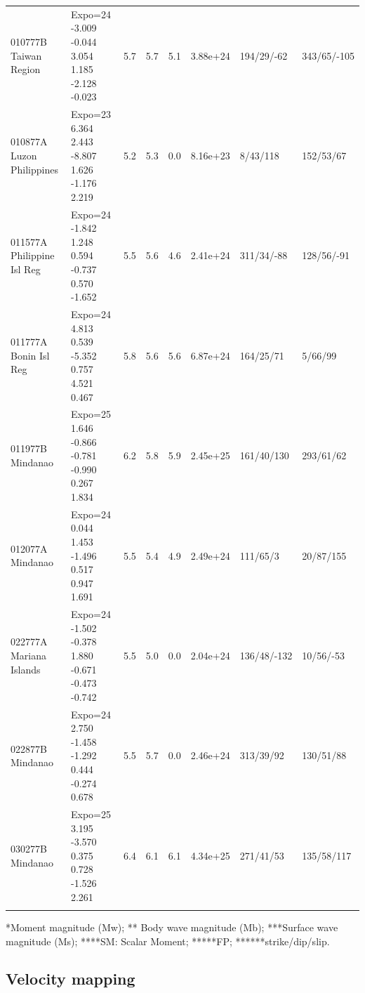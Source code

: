\documentclass[11pt,a4paper]{report}
\begin{document}
{\begin{table}[H]
\begin{center}
{\begin{tabular}{l l l l l l l l}
	010777B Taiwan Region & \makecell{Expo=24 -3.009 -0.044 \\ 3.054 1.185 -2.128 -0.023} & 5.7 & 5.7 & 5.1 & 3.88e+24 & 194/29/-62 & 343/65/-105 \\
	010877A Luzon Philippines & \makecell{Expo=23 6.364 2.443 \\ -8.807 1.626 -1.176 2.219} & 5.2 & 5.3 & 0.0 & 8.16e+23 & 8/43/118 & 152/53/67 \\
	 011577A Philippine Isl Reg & \makecell{Expo=24 -1.842 1.248 \\ 0.594 -0.737 0.570 -1.652} & 5.5 & 5.6 & 4.6 & 2.41e+24 & 311/34/-88 & 128/56/-91 \\
	011777A Bonin Isl Reg & \makecell{Expo=24 4.813 0.539 \\ -5.352 0.757 4.521 0.467} & 5.8 & 5.6 & 5.6 & 6.87e+24 & 164/25/71 & 5/66/99 \\
	011977B Mindanao & \makecell{Expo=25 1.646 -0.866 \\ -0.781 -0.990 0.267 1.834} & 6.2 & 5.8 & 5.9 & 2.45e+25 & 161/40/130 & 293/61/62 \\
	012077A Mindanao & \makecell{Expo=24 0.044 1.453 \\ -1.496 0.517 0.947 1.691} & 5.5 & 5.4 & 4.9 & 2.49e+24 & 111/65/3 & 20/87/155 \\
	022777A Mariana Islands & \makecell{Expo=24 -1.502 -0.378 \\ 1.880 -0.671 -0.473 -0.742} & 5.5 & 5.0 & 0.0 & 2.04e+24 & 136/48/-132 & 10/56/-53 \\
	022877B Mindanao & \makecell{Expo=24  2.750 -1.458 \\ -1.292 0.444 -0.274 0.678} & 5.5 & 5.7 & 0.0 & 2.46e+24 & 313/39/92 & 130/51/88 \\
	030277B Mindanao & \makecell{Expo=25  3.195 -3.570 \\ 0.375 0.728 -1.526 2.261} & 6.4 & 6.1 & 6.1 & 4.34e+25 & 271/41/53 & 135/58/117\\
\noalign{\smallskip}\hline
\end{tabular}
}%
\end{center}
*Moment magnitude (Mw); ** Body wave magnitude (Mb); ***Surface wave magnitude (Ms); ****SM: Scalar Moment; *****\ac{FP}; ******strike/dip/slip.
\end{table}

\pagebreak
\subsection{Velocity mapping} 

}
\end{document}

